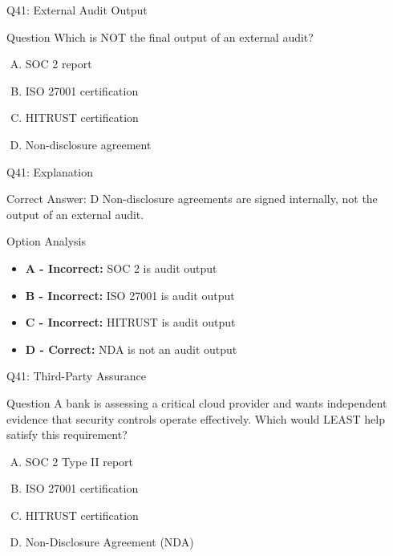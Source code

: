 \documentclass{beamer}
\begin{document}
	\begin{frame}{Q41: External Audit Output}
		\begin{block}{Question}
			Which is NOT the final output of an external audit?
		\end{block}
		\begin{enumerate}[(A)]
			\item SOC 2 report
			\item ISO 27001 certification
			\item HITRUST certification
			\item Non-disclosure agreement
		\end{enumerate}
	\end{frame}
	
	\begin{frame}{Q41: Explanation}
		\begin{block}{Correct Answer: D}
			Non-disclosure agreements are signed internally, not the output of an external audit.
		\end{block}
		\begin{block}{Option Analysis}
			\begin{itemize}
				\item \textbf{A - Incorrect:} SOC 2 is audit output
				\item \textbf{B - Incorrect:} ISO 27001 is audit output
				\item \textbf{C - Incorrect:} HITRUST is audit output
				\item \textbf{D - Correct:} NDA is not an audit output
			\end{itemize}
		\end{block}
	\end{frame}
	
	
	\begin{frame}{Q41: Third-Party Assurance} \begin{block}{Question} A bank is assessing a critical cloud provider and wants independent evidence that security controls operate effectively. Which would LEAST help satisfy this requirement? \end{block} \begin{enumerate}[(A)] \item SOC 2 Type II report \item ISO 27001 certification \item HITRUST certification \item Non-Disclosure Agreement (NDA) \end{enumerate} \end{frame} 
	
\end{document}
